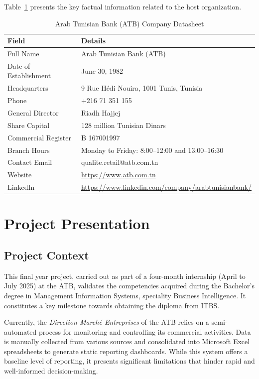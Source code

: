 Table~\ref{tab:fiche_atb} presents the key factual information related to the host organization.

\begin{table}[H]
\centering
\renewcommand{\arraystretch}{1.6}
\caption{Arab Tunisian Bank (ATB) Company Datasheet}
\label{tab:fiche_atb}
\begin{tabular}{|p{5cm}|p{9cm}|}
\hline
\rowcolor{blue!15}
\textbf{Field} & \textbf{Details} \\ \hline
Full Name & Arab Tunisian Bank (ATB) \\ \hline
Date of Establishment & June 30, 1982 \\ \hline
Headquarters & 9 Rue H\'edi Nouira, 1001 Tunis, Tunisia \\ \hline
Phone & +216 71 351 155 \\ \hline
General Director & Riadh Hajjej \\ \hline
Share Capital & 128 million Tunisian Dinars \\ \hline
Commercial Register & B 167001997 \\ \hline
Branch Hours & Monday to Friday: 8:00--12:00 and 13:00--16:30 \\ \hline
Contact Email & qualite.retail@atb.com.tn \\ \hline
Website & \url{https://www.atb.com.tn} \\ \hline
LinkedIn & \url{https://www.linkedin.com/company/arabtunisianbank/} \\ \hline
\end{tabular}
\end{table}
\FloatBarrier

\section{Project Presentation}

\subsection{Project Context}

This final year project, carried out as part of a four-month internship (April to July 2025)
at the ATB, validates the competencies acquired during the Bachelor's degree in Management
Information Systems, speciality Business Intelligence. It constitutes a key milestone towards
obtaining the diploma from ITBS.

Currently, the \textit{Direction March\'{e} Entreprises} of the ATB relies on a semi-automated
process for monitoring and controlling its commercial activities. Data is manually collected
from various sources and consolidated into Microsoft Excel spreadsheets to generate static
reporting dashboards. While this system offers a baseline level of reporting, it presents
significant limitations that hinder rapid and well-informed decision-making.

